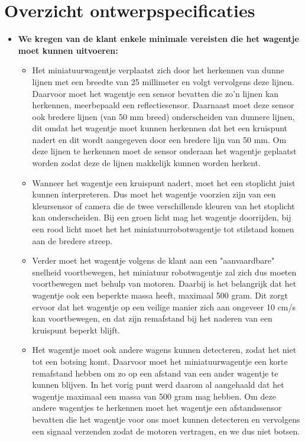 \documentclass[12pt]{article}
\begin{document}
\section*{Overzicht ontwerpspecificaties}

\begin{itemize}
	 

	\item\textbf{We kregen van de klant enkele minimale vereisten die het wagentje moet kunnen uitvoeren:}

	\begin{itemize}
		\item Het miniatuurwagentje verplaatst zich door het herkennen van dunne lijnen met een breedte van 25 millimeter en volgt vervolgens deze lijnen. 
		Daarvoor moet het wagentje een sensor bevatten die zo'n lijnen kan herkennen, meerbepaald een reflectiesensor. 
		Daarnaast moet deze sensor ook bredere lijnen (van 50 mm breed) onderscheiden van dunnere lijnen, dit omdat het wagentje moet kunnen herkennen dat het een kruispunt nadert en dit wordt aangegeven door een bredere lijn van 50 mm.
		Om deze lijnen te herkennen moet de sensor onderaan het wagentje geplaatst worden zodat deze de lijnen makkelijk kunnen worden herkent.
		\item Wanneer het wagentje een kruispunt nadert, moet het een stoplicht juist kunnen interpreteren.
		Dus moet het wagentje voorzien zijn van een kleursensor of camera die de twee verschillende kleuren van het stoplicht kan onderscheiden.
		Bij een groen licht mag het wagentje doorrijden, bij een rood licht moet het het miniatuurrobotwagentje tot stilstand komen aan de bredere streep. 
		\item Verder moet het wagentje volgens de klant aan een "aanvaardbare" snelheid voortbewegen, het miniatuur robotwagentje zal zich dus moeten voortbewegen met behulp van motoren.
		Daarbij is het belangrijk dat het wagentje ook een beperkte massa heeft, maximaal 500 gram.
		Dit zorgt ervoor dat het wagentje op een veilige manier zich aan ongeveer 10 cm/s kan voortbewegen, en dat zijn remafstand bij het naderen van een kruispunt beperkt blijft.
		\item Het wagentje moet ook andere wagens kunnen detecteren, zodat het niet tot een botsing komt. Daarvoor moet het miniatuurwagentje een korte remafstand hebben om zo op een afstand van een ander wagentje te kunnen blijven.
		In het vorig punt werd daarom al aangehaald dat het wagentje maximaal een massa van 500 gram mag hebben. 
		Om deze andere wagentjes te herkennen moet het wagentje een afstandssensor bevatten die het wagentje voor ons moet kunnen detecteren en vervolgens een signaal verzenden zodat de motoren vertragen, en we dus niet botsen.

\end{itemize}
\end{itemize}
\end{document}
